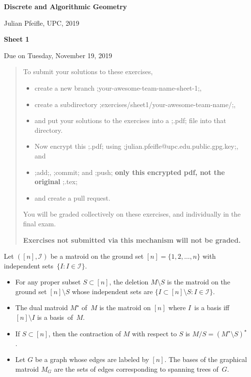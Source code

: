 \documentclass[11pt]{amsart}
\newcommand{\defn}[1]{{\color{blue}#1}}
\newcommand{\alert}[1]{\textbf{\color{red}#1}}
\begin{document}
\begin{center}
\textbf{\sffamily
   Discrete and Algorithmic Geometry }

\medskip
   Julian Pfeifle,
   UPC, 2019
\end{center}

\bigskip

\begin{center}
  \textbf{\sffamily Sheet 1}

  \bigskip\bigskip
Due on Tuesday, November 19, 2019
\end{center}

\bigskip


\begin{quote}\small
  To submit your solutions to these exercises,
  \begin{itemize}[$\quad\triangleright$]
  \item create a new branch ;your-awesome-team-name-sheet-1;,
  \item create a subdirectory ;exercises/sheet1/your-awesome-team-name/;,
  \item and put your solutions to the exercises into a ;.pdf; file into that directory.
  \item Now encrypt this ;.pdf; using ;julian.pfeifle@upc.edu.public.gpg.key;, and
  \item ;add;, ;commit; and ;push; \alert{only this encrypted pdf, not the original} ;.tex;
  \item and create a pull request.
  \end{itemize}
  You will be graded collectively on these exercises, and individually in the final exam.

  \alert{Exercises not submitted via this mechanism will not be graded.}
\end{quote}

\bigskip

Let $([n],\mathcal I)$ be a matroid on the ground set $[n]=\{1,2,\dots,n\}$ with independent sets~$\{I:I\in\mathcal I\}$.

\begin{itemize}[$\triangleright$]
\item
  For any proper subset $S\subset[n]$, the \defn{deletion}
  $M\setminus S$ is the matroid on the ground set $[n]\setminus S$ whose
  independent sets are $\{I\subset[n]\setminus S : I\in\mathcal I\}$.

\item
  The \defn{dual matroid} $M^\star$ of~$M$ is the matroid on $[n]$ where $I$~is a basis iff $[n]\setminus I$ is a basis~of~$M$.

\item
  If $S\subset[n]$, then the \defn{contraction} of $M$ with respect to $S$ is $M/S = (M^\star\setminus S)^\star$.

\item
  Let $G$ be a graph whose edges are labeled by $[n]$.
  The bases of the \defn{graphical matroid} $M_G$ are the sets of edges corresponding to spanning trees of~$G$.
\end{itemize}
\end{document}
